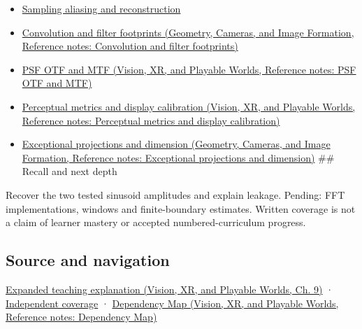 \hypertarget{appendix-b60686ba06a1-used-by}{}

\begin{itemize}
\item
  \hyperref[appendix-6a7869dd79a6]{Sampling aliasing and reconstruction}
\item
  \href{../03-Geometry-Cameras-and-Image-Formation/main.pdf\#nameddest=appendix-d5b3c692d9f0}{Convolution and filter footprints (Geometry, Cameras, and Image Formation, Reference notes: Convolution and filter footprints)}
\item
  \href{../07-Vision-XR-and-Playable-Worlds/main.pdf\#nameddest=appendix-8b76b0efd27f}{PSF OTF and MTF (Vision, XR, and Playable Worlds, Reference notes: PSF OTF and MTF)}
\item
  \href{../07-Vision-XR-and-Playable-Worlds/main.pdf\#nameddest=appendix-b2c1846508bf}{Perceptual metrics and display calibration (Vision, XR, and Playable Worlds, Reference notes: Perceptual metrics and display calibration)}
\item
  \href{../03-Geometry-Cameras-and-Image-Formation/main.pdf\#nameddest=appendix-3c73f7862157}{Exceptional projections and dimension (Geometry, Cameras, and Image Formation, Reference notes: Exceptional projections and dimension)} \#\# Recall and next depth
\end{itemize}

Recover the two tested sinusoid amplitudes and explain leakage. Pending: FFT implementations, windows and finite-boundary estimates. Written coverage is not a claim of learner mastery or accepted numbered-curriculum progress.

\subsection{Source and navigation}\label{appendix-b60686ba06a1-source-and-navigation}

\hypertarget{appendix-b60686ba06a1-source-and-navigation}{}

\href{../07-Vision-XR-and-Playable-Worlds/main.pdf\#nameddest=04-visual-computing-ii-ch042-fourier-coordinates-reveal-what-a-filter-removes}{Expanded teaching explanation (Vision, XR, and Playable Worlds, Ch. 9)} · \hyperref[appendix-fd090d982a15-xr01---independent-seeing-and-representation-source]{Independent coverage} · \href{../07-Vision-XR-and-Playable-Worlds/main.pdf\#nameddest=appendix-4ad47bdd269a}{Dependency Map (Vision, XR, and Playable Worlds, Reference notes: Dependency Map)}

